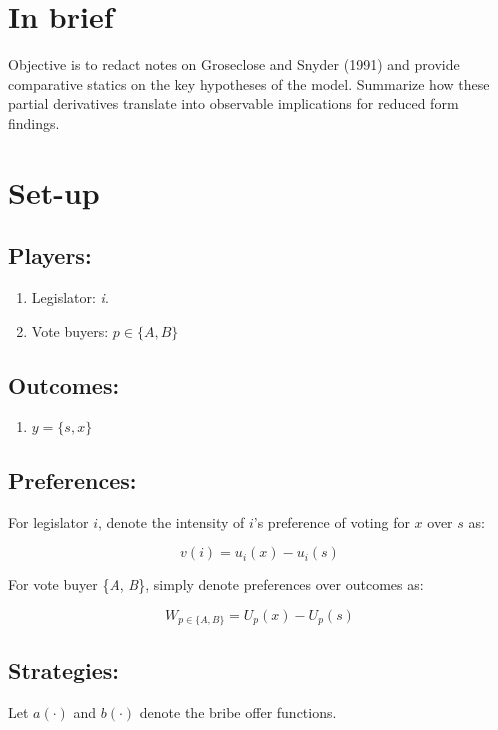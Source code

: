 \documentclass[a4paper,12pt]{article}
\begin{document}
\section{In brief}
Objective is to redact notes on Groseclose and Snyder (1991) and provide comparative statics on the key hypotheses of the model. Summarize how these partial derivatives translate into observable implications for reduced form findings.

\section{Set-up}

\subsection*{Players:}
\begin{enumerate}
    \item Legislator: \textit{i}.
    \item Vote buyers: $p \in \{A, B\}$
\end{enumerate}

\subsection*{Outcomes:}
\begin{enumerate}
    \item $y = \{s, x\}$
\end{enumerate}

\subsection*{Preferences:}
For legislator $i$, denote the intensity of $i$'s preference of voting for $x$ over $s$ as:

$$v(i) = u_i(x) - u_i(s)$$

For vote buyer \{\textit{A}, \textit{B}\}, simply denote preferences over outcomes as:

$$W_{p \in \{A, B\}} = U_p(x) - U_p(s)$$

\subsection*{Strategies:}
Let $a(\cdot)$ and $b(\cdot)$ denote the bribe offer functions.
\end{document}
